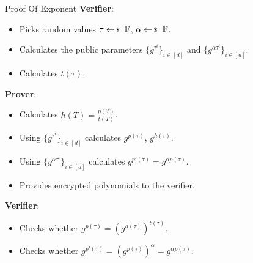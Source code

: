 \documentclass{zkdl-presentation-template}
\begin{document}
    \begin{frame}{Proof Of Exponent}
        \textbf{Verifier}:
        \vspace{-5pt}
        \begin{itemize}[label=]
            \item \vspace{-3pt} Picks random values $\tau \leftarrowS \mathbb{F}$, $\alpha \leftarrowS \mathbb{F}$. \pause
            \item \vspace{-3pt} Calculates the public parameters $\{g^{\tau^i}\}_{i \in [d]}$ and $\{g^{\alpha\tau^i}\}_{i \in [d]}$. \pause
            \item \vspace{-3pt} Calculates $t(\tau)$. \pause
        \end{itemize}
        \textbf{Prover}:
        \vspace{-5pt}
        \begin{itemize}[label=]
            \item \vspace{-3pt} Calculates $h(T) = \frac{p(T)}{t(T)}$. \pause
            \item \vspace{-3pt} Using $\{g^{\tau^i}\}_{i \in [d]}$ calculates $g^{p(\tau)}$, $g^{h(\tau)}$. \pause
            \item \vspace{-3pt} Using $\{g^{\alpha\tau^i}\}_{i \in [d]}$ calculates $g^{p'(\tau)} = g^{\alpha p(\tau)}$. \pause
            \item \vspace{-3pt} Provides encrypted polynomials to the verifier. \pause
        \end{itemize}
        \textbf{Verifier}:
        \vspace{-5pt}
        \begin{itemize}[label=]
            \item \vspace{-3pt} Checks whether $g^{p(\tau)} = \left( g^{h(\tau)} \right)^{t(\tau)}$. \pause
            \item \vspace{-3pt} Checks whether $g^{p'(\tau)} = \left( g^{p(\tau)} \right)^{\alpha} = g^{\alpha p(\tau)}$.
        \end{itemize}
    \end{frame}

    \makeclosingframe
\end{document}
